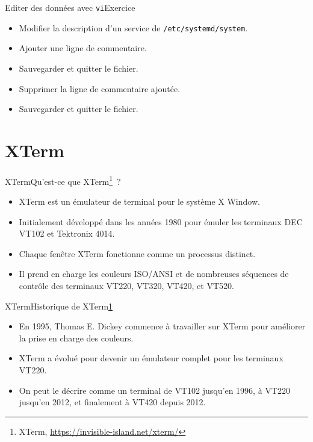 \documentclass{beamer}
\begin{document}
    \begin{frame}{Editer des données avec \lstinline{vi}}{Exercice \execcounterdispinc}
        \begin{itemize}
            \item Modifier la description d'un service de \lstinline{/etc/systemd/system}.
            \item Ajouter une ligne de commentaire.
            \item Sauvegarder et quitter le fichier.
            \item Supprimer la ligne de commentaire ajoutée.
            \item Sauvegarder et quitter le fichier.
        \end{itemize}
    \end{frame}


    \section{XTerm}\label{sec:xterm}

    \begin{frame}{XTerm}{Qu'est-ce que XTerm\footnote{\label{xterm}XTerm, \url{https://invisible-island.net/xterm/}}~?}
        \begin{itemize}
            \item XTerm est un émulateur de terminal pour le système X Window.
            \item Initialement développé dans les années 1980 pour émuler les terminaux DEC VT102 et Tektronix 4014.
            \item Chaque fenêtre XTerm fonctionne comme un processus distinct.
            \item Il prend en charge les couleurs ISO/ANSI et de nombreuses séquences de contrôle des terminaux VT220, VT320, VT420, et VT520.
        \end{itemize}
    \end{frame}

    \begin{frame}{XTerm}{Historique de XTerm\cref{xterm}}
        \begin{itemize}
            \item En 1995, Thomas E. Dickey commence à travailler sur XTerm pour améliorer la prise en charge des couleurs.
            \item XTerm a évolué pour devenir un émulateur complet pour les terminaux VT220.
            \item On peut le décrire comme un terminal de VT102 jusqu'en 1996, à VT220 jusqu'en 2012, et finalement à VT420 depuis 2012.
        \end{itemize}
    \end{frame}
\end{document}
